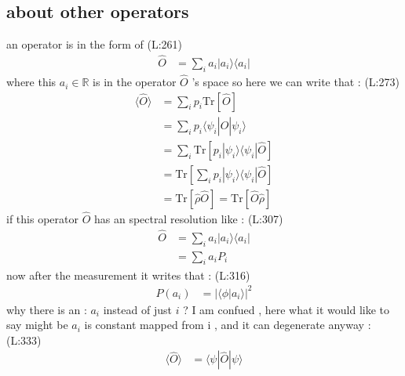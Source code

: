 \subsection{about other operators}
 an operator is in the form of 
(L:261)
\begin{equation}
\begin{split}
\hat{O }&=\sum _{i }a _{i }|a _{i }\rangle \langle a _{i }|\end{split}
\end{equation}
 where this 
 $ a _{i }\in \mathds{R } $  is in the operator 
 $ \hat{O } $  's space 
 so here we can write that : 
(L:273)
\begin{equation}
\begin{split}
\langle \hat{O }\rangle &=\sum _{i }p _{i }\text{Tr}\left[\hat{O }\right]\\
&=\sum _{i }p _{i }\langle \psi _{i }|\hat{O }|\psi _{i }\rangle \\
&=\sum _{i }\text{Tr}\left[p _{i }|\psi _{i }\rangle \langle \psi _{i }|\hat{O }\right]\\
&=\text{Tr}\left[\sum _{i }p _{i }|\psi _{i }\rangle \langle \psi _{i }|\hat{O }\right]\\
&=\text{Tr}\left[\hat{\rho }\hat{O }\right]=\text{Tr}\left[\hat{O }\hat{\rho }\right]\end{split}
\end{equation}
 if this operator
 $ \hat{O } $  has an spectral resolution like : 
(L:307)
\begin{equation}
\begin{split}
\hat{O }&=\sum _{i }a _{i }|a _{i }\rangle \langle a _{i }|\\
&=\sum _{i }a _{i }P _{i }\end{split}
\end{equation}
 now after the measurement it writes that :
(L:316)
\begin{equation}
\begin{split}
P (a _{i })&=|{\langle \phi |a _{i }\rangle}|^{2}\end{split}
\end{equation}
why there is an :
 $ a _{i } $  instead of just
 $ i  $  ? I am confued , 
 here what it would like to say might be
 $ a _{i } $  is constant mapped from i , and it can degenerate
 anyway : 
(L:333)
\begin{equation}
\begin{split}
\langle \hat{O }\rangle &=\langle \psi |\hat{O }|\psi \rangle \end{split}
\end{equation}
